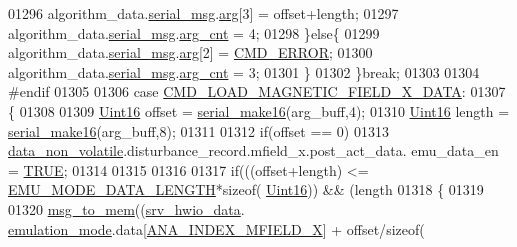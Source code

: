 \begin{DoxyCode}
{{{{{01296                          algorithm\_data.\hyperlink{a00016_afcf5f557aea688aad985eec15269c1da}{serial\_msg}.\hyperlink{a00031_af7d6f762438c80072bd9dc0e4dd4ae1e}{arg}[3] = offset+length;
01297                          algorithm\_data.\hyperlink{a00016_afcf5f557aea688aad985eec15269c1da}{serial\_msg}.\hyperlink{a00031_a7b79f40e2eeec288091afd340bf8f591}{arg\_cnt} = 4;
01298                      \}\textcolor{keywordflow}{else}\{
01299                          algorithm\_data.\hyperlink{a00016_afcf5f557aea688aad985eec15269c1da}{serial\_msg}.\hyperlink{a00031_af7d6f762438c80072bd9dc0e4dd4ae1e}{arg}[2] = 
      \hyperlink{a00021_a1764a522e9c1a59a59be8757c69fa494}{CMD\_ERROR};
01300                          algorithm\_data.\hyperlink{a00016_afcf5f557aea688aad985eec15269c1da}{serial\_msg}.\hyperlink{a00031_a7b79f40e2eeec288091afd340bf8f591}{arg\_cnt} = 3;
01301                      \}
01302                 \}\textcolor{keywordflow}{break};
01303 
01304 \textcolor{preprocessor}{#endif}
01305 
01306                  \textcolor{keywordflow}{case}  \hyperlink{a00021_a9e5d9d302e44daccbe233d321696b12c}{CMD\_LOAD\_MAGNETIC\_FIELD\_X\_DATA}:
01307                 \{
01308 
01309                     \hyperlink{a00072_a59a9f6be4562c327cbfb4f7e8e18f08b}{Uint16} offset = \hyperlink{a00031_abc17de32f14103a5be219df0d4ad9176}{serial\_make16}(arg\_buff,4);
01310                     \hyperlink{a00072_a59a9f6be4562c327cbfb4f7e8e18f08b}{Uint16} length = \hyperlink{a00031_abc17de32f14103a5be219df0d4ad9176}{serial\_make16}(arg\_buff,8);
01311 
01312                     \textcolor{keywordflow}{if}(offset == 0)
01313                         \hyperlink{a00060_a76ac5f917f5308dcd83de0d7c94559fb}{data\_non\_volatile}.disturbance\_record.mfield\_x.post\_act\_data.
      emu\_data\_en = \hyperlink{a00040_aa8cecfc5c5c054d2875c03e77b7be15d}{TRUE};
01314 
01315 
01316                
01317                      \textcolor{keywordflow}{if}(((offset+length) <= \hyperlink{a00022_af4c3a8ad94feb4d7bda7f107f34baf41}{EMU\_MODE\_DATA\_LENGTH}*\textcolor{keyword}{sizeof}(
      \hyperlink{a00072_a59a9f6be4562c327cbfb4f7e8e18f08b}{Uint16})) && (length%
01318                       \{
01319 
01320                        \hyperlink{a00038_a126f3d78a95341a19a3e862e57357952}{msg\_to\_mem}((\hyperlink{a00034_a0fd91014631926f362c7c2b2f5d143b0}{srv\_hwio\_data}.
      \hyperlink{a00034_a742dceaef1f19ec73ed5acc066127476}{emulation\_mode}.data[\hyperlink{a00058_aa797210faae0317a1b0ddace04d1257e}{ANA\_INDEX\_MFIELD\_X}] + offset/\textcolor{keyword}{sizeof}(
}}}}}
\end{DoxyCode}
